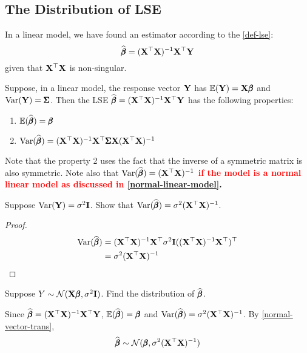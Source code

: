     \subsection{The Distribution of LSE}
    In a linear model, we have found an estimator according to the \cref{def-lse}:
    \begin{equation*}
        \widehat{\pmb{\beta}} = (\mathbf{X}^{\top}\mathbf{X})^{-1}\mathbf{X}^{\top}\mathbf{Y}
    \end{equation*}
    given that $\mathbf{X}^{\top}\mathbf{X}$ is non-singular.
    \begin{Thm}
        Suppose, in a linear model, the response vector $\mathbf{Y}$ has $\mathbb{E}(\mathbf{Y}) = \mathbf{X}\pmb{\beta}$ and $\text{Var}(\mathbf{Y}) = \pmb{\Sigma}$. Then the LSE $\widehat{\pmb{\beta}} = (\mathbf{X}^{\top}\mathbf{X})^{-1}\mathbf{X}^{\top}\mathbf{Y}$ has the following properties:
        \begin{enumerate}
            \item $\mathbb{E}(\widehat{\pmb{\beta}}) = \pmb{\beta}$
            \item $\text{Var}(\widehat{\pmb{\beta}}) = (\mathbf{X}^{\top}\mathbf{X})^{-1}\mathbf{X}^{\top}\pmb{\Sigma} \mathbf{X}(\mathbf{X}^{\top}\mathbf{X})^{-1}$
        \end{enumerate}
        Note that the property 2 uses the fact that the inverse of a symmetric matrix is also symmetric. Note also that \textbf{\textcolor{red}{$\text{Var}(\widehat{\pmb{\beta}}) = (\mathbf{X}^{\top}\mathbf{X})^{-1}$ if the model is a normal linear model as discussed in \cref{normal-linear-model}}.}
    \end{Thm}
    \begin{Ex}
        Suppose $\text{Var}(\mathbf{Y}) = \sigma^2\mathbf{I}$. Show that $\text{Var}(\widehat{\pmb{\beta}}) = \sigma^2 (\mathbf{X}^{\top}\mathbf{X})^{-1}$.
        \begin{proof}
            \begin{align*}
                \text{Var}(\widehat{\pmb{\beta}}) &= (\mathbf{X}^{\top}\mathbf{X})^{-1}\mathbf{X}^{\top} \sigma^2\mathbf{I} ((\mathbf{X}^{\top}\mathbf{X})^{-1}\mathbf{X}^{\top})^{\top}\\
                & = \sigma^2 (\mathbf{X}^{\top}\mathbf{X})^{-1} 
            \end{align*}
        \end{proof}
    \end{Ex}
    \begin{Ex}
        Suppose $Y \sim \mathcal{N}(\mathbf{X}\pmb{\beta}, \sigma^2\mathbf{I})$. Find the distribution of $\widehat{\pmb{\beta}}$.
        \begin{sol}
            Since $\widehat{\pmb{\beta}} = (\mathbf{X}^{\top}\mathbf{X})^{-1}\mathbf{X}^{\top}\mathbf{Y}$, $\mathbb{E}(\widehat{\pmb{\beta}}) = \pmb{\beta}$ and $\text{Var}(\widehat{\pmb{\beta}}) = \sigma^2 (\mathbf{X}^{\top}\mathbf{X})^{-1}$. By \cref{normal-vector-trans}, 
            \begin{equation*}
                \widehat{\pmb{\beta}} \sim \mathcal{N}(\pmb{\beta}, \sigma^2 (\mathbf{X}^{\top}\mathbf{X})^{-1})
            \end{equation*}
        \end{sol}
    \end{Ex}

